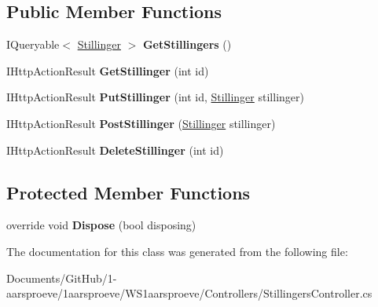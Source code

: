 \subsection*{Public Member Functions}
\begin{DoxyCompactItemize}
\item 
\hypertarget{class_w_s1aarsproeve_1_1_controllers_1_1_stillingers_controller_a89e0a343231594bbb6158b403937ffe3}{}I\+Queryable$<$ \hyperlink{class_w_s1aarsproeve_1_1_stillinger}{Stillinger} $>$ {\bfseries Get\+Stillingers} ()\label{class_w_s1aarsproeve_1_1_controllers_1_1_stillingers_controller_a89e0a343231594bbb6158b403937ffe3}

\item 
\hypertarget{class_w_s1aarsproeve_1_1_controllers_1_1_stillingers_controller_a5915790edc180ab43082fc0e46738ee3}{}I\+Http\+Action\+Result {\bfseries Get\+Stillinger} (int id)\label{class_w_s1aarsproeve_1_1_controllers_1_1_stillingers_controller_a5915790edc180ab43082fc0e46738ee3}

\item 
\hypertarget{class_w_s1aarsproeve_1_1_controllers_1_1_stillingers_controller_a22ea0a796ede7f745d7917520d0ef51f}{}I\+Http\+Action\+Result {\bfseries Put\+Stillinger} (int id, \hyperlink{class_w_s1aarsproeve_1_1_stillinger}{Stillinger} stillinger)\label{class_w_s1aarsproeve_1_1_controllers_1_1_stillingers_controller_a22ea0a796ede7f745d7917520d0ef51f}

\item 
\hypertarget{class_w_s1aarsproeve_1_1_controllers_1_1_stillingers_controller_a03108b1eaaacb0754bad628589d5b632}{}I\+Http\+Action\+Result {\bfseries Post\+Stillinger} (\hyperlink{class_w_s1aarsproeve_1_1_stillinger}{Stillinger} stillinger)\label{class_w_s1aarsproeve_1_1_controllers_1_1_stillingers_controller_a03108b1eaaacb0754bad628589d5b632}

\item 
\hypertarget{class_w_s1aarsproeve_1_1_controllers_1_1_stillingers_controller_a86914892cc489a6b4ed4101237d69647}{}I\+Http\+Action\+Result {\bfseries Delete\+Stillinger} (int id)\label{class_w_s1aarsproeve_1_1_controllers_1_1_stillingers_controller_a86914892cc489a6b4ed4101237d69647}

\end{DoxyCompactItemize}
\subsection*{Protected Member Functions}
\begin{DoxyCompactItemize}
\item 
\hypertarget{class_w_s1aarsproeve_1_1_controllers_1_1_stillingers_controller_a4a1aa143432294a137a9db76dab6477a}{}override void {\bfseries Dispose} (bool disposing)\label{class_w_s1aarsproeve_1_1_controllers_1_1_stillingers_controller_a4a1aa143432294a137a9db76dab6477a}

\end{DoxyCompactItemize}


The documentation for this class was generated from the following file\+:\begin{DoxyCompactItemize}
\item 
Documents/\+Git\+Hub/1-\/aarsproeve/1aarsproeve/\+W\+S1aarsproeve/\+Controllers/Stillingers\+Controller.\+cs\end{DoxyCompactItemize}
